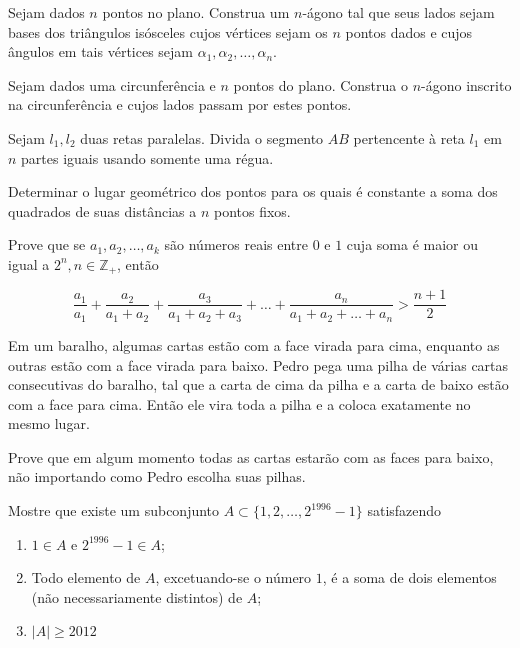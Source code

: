 \begin{questao}
  Sejam dados $n$ pontos no plano. Construa um $n$-ágono tal que seus lados
  sejam bases dos triângulos isósceles cujos vértices sejam os $n$ pontos dados
  e cujos ângulos em tais vértices sejam $\alpha_1,\alpha_2,\ldots,\alpha_n$.
\end{questao}

\begin{questao}
  Sejam dados uma circunferência e $n$ pontos do plano. Construa o $n$-ágono
  inscrito na circunferência e cujos lados passam por estes pontos.
\end{questao}

\begin{questao}
  Sejam $l_1,l_2$ duas retas paralelas. Divida o segmento ${AB}$ pertencente à
  reta $l_1$ em $n$ partes iguais usando somente uma régua.
\end{questao}

\begin{questao}
  Determinar o lugar geométrico dos pontos para os quais é constante a soma dos
  quadrados de suas distâncias a $n$ pontos fixos.
\end{questao}

\begin{questao}
  Prove que se $a_1,a_2,\ldots,a_k$ são números reais entre $0$ e $1$ cuja soma
  é maior ou igual a $2^n, n \in \mathbb{Z}_+$, então

  $$ \frac{a_1}{a_1}+\frac{a_2}{a_1+a_2}+\frac{a_3}{a_1+a_2+a_3}
  +\ldots+\frac{a_n}{a_1+a_2+\ldots+a_n} > \frac{n+1}{2} $$
\end{questao}

\begin{questao}
  Em um baralho, algumas cartas estão com a face virada para cima, enquanto as
  outras estão com a face virada para baixo. Pedro pega uma pilha de várias
  cartas consecutivas do baralho, tal que a carta de cima da pilha e a carta de
  baixo estão com a face para cima. Então ele vira toda a pilha e a coloca
  exatamente no mesmo lugar.

  Prove que em algum momento todas as cartas estarão com as faces para baixo,
  não importando como Pedro escolha suas pilhas.
\end{questao}

\begin{questao}
  Mostre que existe um subconjunto $A \subset \{1,2,\ldots,2^{1996}-1\}$
  satisfazendo

  \begin{enumerate}

  \item $1 \in A$ e $2^{1996}-1 \in A$;

  \item Todo elemento de $A$, excetuando-se o número $1$, é a soma de dois
    elementos (não necessariamente distintos) de $A$;

  \item $|A| \geq 2012$
  \end{enumerate}
\end{questao}

